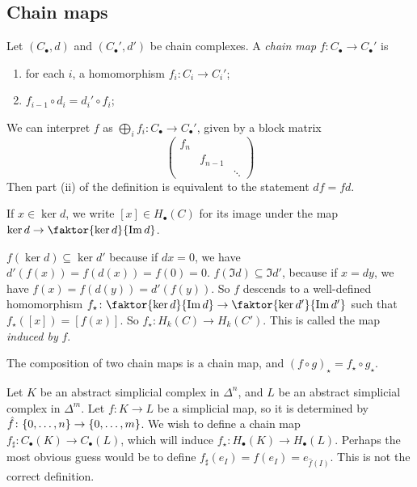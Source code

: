 \subsection{Chain maps}
\begin{definition}
	Let \( (C_\bullet, d) \) and \( (C_\bullet', d') \) be chain complexes.
	A \emph{chain map} \( f \colon C_\bullet \to C_\bullet' \) is
	\begin{enumerate}
		\item for each \( i \), a homomorphism \( f_i \colon C_i \to C_i' \);
		\item \( f_{i-1} \circ d_i = d_i' \circ f_i \);
	\end{enumerate}
\end{definition}
\begin{remark}
	We can interpret \( f \) as \( \bigoplus_i f_i \colon C_\bullet \to C_\bullet' \), given by a block matrix
	\[ \begin{pmatrix}
		f_n \\
		& f_{n-1} \\
		& & \ddots
	\end{pmatrix} \]
	Then part (ii) of the definition is equivalent to the statement \( d f = f d \).
\end{remark}
If \( x \in \ker d \), we write \( [x] \in H_\bullet(C) \) for its image under the map \( \ker d \to \faktor{\ker d}{\Im d} \).
\begin{remark}
	\( f(\ker d) \subseteq \ker d' \) because if \( dx = 0 \), we have \( d'(f(x)) = f(d(x)) = f(0) = 0 \).
	\( f(\Im d) \subseteq \Im d' \), because if \( x = dy \), we have \( f(x) = f(d(y)) = d'(f(y)) \).
	So \( f \) descends to a well-defined homomorphism \( f_\star \colon \faktor{\ker d}{\Im d} \to \faktor{\ker d'}{\Im d'} \) such that \( f_\star([x]) = [f(x)] \).
	So \( f_\star \colon H_k(C) \to H_k(C') \).
	This is called the map \emph{induced by} \( f \).
\end{remark}
\begin{remark}
	The composition of two chain maps is a chain map, and \( (f \circ g)_\star = f_\star \circ g_\star \).
\end{remark}
Let \( K \) be an abstract simplicial complex in \( \Delta^n \), and \( L \) be an abstract simplicial complex in \( \Delta^m \).
Let \( f \colon K \to L \) be a simplicial map, so it is determined by \( \hat f \colon \qty{0, \dots, n} \to \qty{0, \dots, m} \).
We wish to define a chain map \( f_\sharp \colon C_\bullet(K) \to C_\bullet(L) \), which will induce \( f_\star \colon H_\bullet(K) \to H_\bullet(L) \).
Perhaps the most obvious guess would be to define \( f_\sharp(e_I) = f(e_I) = e_{\hat f(I)} \).
This is not the correct definition.

